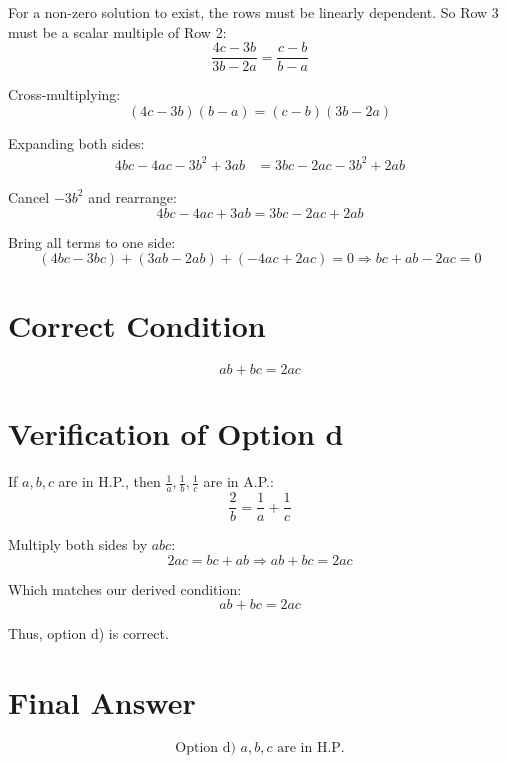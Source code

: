 \documentclass[journal]{IEEEtran}
\begin{document}
For a non-zero solution to exist, the rows must be linearly dependent. So Row 3 must be a scalar multiple of Row 2:
\[
\frac{4c - 3b}{3b - 2a} = \frac{c - b}{b - a}
\]

Cross-multiplying:
\[
(4c - 3b)(b - a) = (c - b)(3b - 2a)
\]

Expanding both sides:
\begin{align}
4bc - 4ac - 3b^2 + 3ab &= 3bc - 2ac - 3b^2 + 2ab
\end{align}

Cancel \( -3b^2 \) and rearrange:
\[
4bc - 4ac + 3ab = 3bc - 2ac + 2ab
\]

Bring all terms to one side:
\[
(4bc - 3bc) + (3ab - 2ab) + (-4ac + 2ac) = 0
\Rightarrow bc + ab - 2ac = 0
\]

\section*{\large\textbf{Correct Condition}}

\[
\boxed{ab + bc = 2ac}
\]

\section*{\large\textbf{Verification of Option d}}

If \( a, b, c \) are in H.P., then \( \frac{1}{a}, \frac{1}{b}, \frac{1}{c} \) are in A.P.:
\[
\frac{2}{b} = \frac{1}{a} + \frac{1}{c}
\]

Multiply both sides by \( abc \):
\[
2ac = bc + ab
\Rightarrow ab + bc = 2ac
\]

Which matches our derived condition:
\[
\boxed{ab + bc = 2ac}
\]

Thus, option d) is correct.

\section*{\large\textbf{Final Answer}}
\[
\boxed{\text{Option d) } a, b, c \text{ are in H.P.}}
\]
\end{document}
